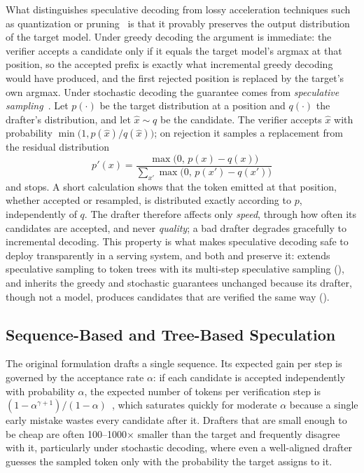What distinguishes speculative decoding from lossy acceleration techniques such as quantization or pruning~\cite{frantar2023gptq,frantar2023sparsegpt,biglittletransformer} is that it provably preserves the output distribution of the target model.
Under greedy decoding the argument is immediate: the verifier accepts a candidate only if it equals the target model's argmax at that position, so the accepted prefix is exactly what incremental greedy decoding would have produced, and the first rejected position is replaced by the target's own argmax.
Under stochastic decoding the guarantee comes from \emph{speculative sampling}~\cite{leviathan2022fast,chen2023accelerating}.
Let $p(\cdot)$ be the target distribution at a position and $q(\cdot)$ the drafter's distribution, and let $\hat{x} \sim q$ be the candidate.
The verifier accepts $\hat{x}$ with probability $\min\!\big(1, p(\hat{x})/q(\hat{x})\big)$; on rejection it samples a replacement from the residual distribution
\[
p'(x) = \frac{\max\big(0,\, p(x) - q(x)\big)}{\sum_{x'} \max\big(0,\, p(x') - q(x')\big)}
\]
and stops.
A short calculation shows that the token emitted at that position, whether accepted or resampled, is distributed exactly according to $p$, independently of $q$.
The drafter therefore affects only \emph{speed}, through how often its candidates are accepted, and never \emph{quality}; a bad drafter degrades gracefully to incremental decoding.
This property is what makes speculative decoding safe to deploy transparently in a serving system, and both \SpecInfer and \SuffixDecoding preserve it: \SpecInfer extends speculative sampling to token trees with its multi-step speculative sampling (), and \SuffixDecoding inherits the greedy and stochastic guarantees unchanged because its drafter, though not a model, produces candidates that are verified the same way ().

\subsection{Sequence-Based and Tree-Based Speculation}
\label{background:subsec:tree}

The original formulation drafts a single sequence.
Its expected gain per step is governed by the acceptance rate $\alpha$: if each candidate is accepted independently with probability $\alpha$, the expected number of tokens per verification step is $(1 - \alpha^{\gamma+1})/(1 - \alpha)$~\cite{leviathan2022fast}, which saturates quickly for moderate $\alpha$ because a single early mistake wastes every candidate after it.
Drafters that are small enough to be cheap are often 100--1000$\times$ smaller than the target and frequently disagree with it, particularly under stochastic decoding, where even a well-aligned drafter guesses the sampled token only with the probability the target assigns to it.

